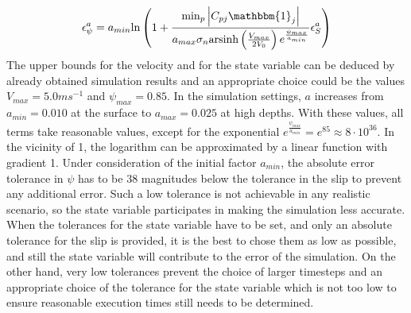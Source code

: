 \begin{equation}
    \epsilon_\psi^a = a_{min}\text{ln}\left( 1+\frac{\min_p\left|C_{pj}\mathbbm{1}_j\right|}{a_{max}\sigma_n \text{arsinh}\left(\frac{V_{max}}{2V_0}\right) e^{\frac{\psi_{max}}{a_{min}}}}\epsilon_S^a\right)
\end{equation}
The upper bounds for the velocity and for the state variable can be deduced by already obtained simulation results and an appropriate choice could be the values $V_{max} = 5.0ms^{-1}$ and $\psi_{max} = 0.85$. In the simulation settings, $a$ increases from $a_{min}=0.010$ at the surface to $a_{max}=0.025$ at high depths. With these values, all terms take reasonable values, except for the exponential $e^{\frac{\psi_{max}}{a_{min}}} = e^{85} \approx 8\cdot10^{36}$. In the vicinity of 1,  the logarithm can be approximated by a linear function with gradient 1. Under consideration of the initial factor $a_{min}$, the absolute error tolerance in $\psi$ has to be 38 magnitudes below the tolerance in the slip to prevent any additional error. Such a low tolerance is not achievable in any realistic scenario, so the state variable participates in making the simulation less accurate. When the tolerances for the state variable have to be set, and only an absolute tolerance for the slip is provided, it is the best to chose them as low as possible, and still the state variable will contribute to the error of the simulation. On the other hand, very low tolerances prevent the choice of larger timesteps and an appropriate choice of the tolerance for the state variable which is not too low to ensure reasonable execution times still needs to be determined.  

